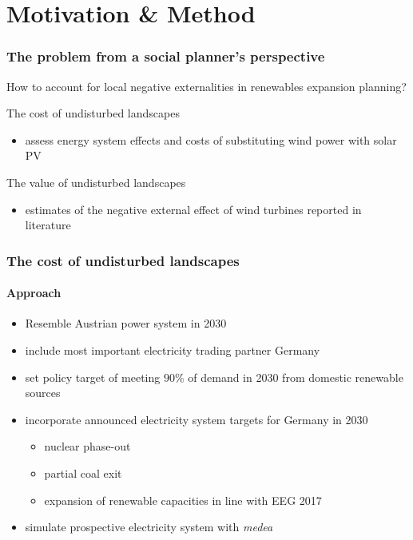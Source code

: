 \documentclass[aspectratio=1610, xcolor=dvipsnames,handout]{beamer} %
\begin{document}
\section{Motivation \& Method}
\begin{frame}
\frametitle{The problem from a social planner's perspective}
How to account for local negative externalities in renewables expansion planning?

\bigskip
\textcolor{bokugreen}{The cost of undisturbed landscapes}
\begin{itemize}
\item assess energy system effects and costs of substituting wind power with solar PV
\end{itemize}

\bigskip
\textcolor{bokugreen}{The value of undisturbed landscapes}
\begin{itemize}
\item estimates of the negative external effect of wind turbines reported in literature
\end{itemize}
\end{frame}


\begin{frame}
\frametitle{The cost of undisturbed landscapes}
\framesubtitle{Approach}
\begin{itemize}
\item Resemble Austrian power system in 2030
\item include most important electricity trading partner Germany \pause
\item set policy target of meeting $90\%$ of demand in 2030 from domestic renewable sources
\item incorporate announced electricity system targets for Germany in 2030
	\begin{itemize}
	\item nuclear phase-out
	\item partial coal exit
	\item expansion of renewable capacities in line with EEG 2017
	\end{itemize} \pause
\item simulate prospective electricity system with \emph{medea}
\end{itemize}
\end{frame}
\end{document}
